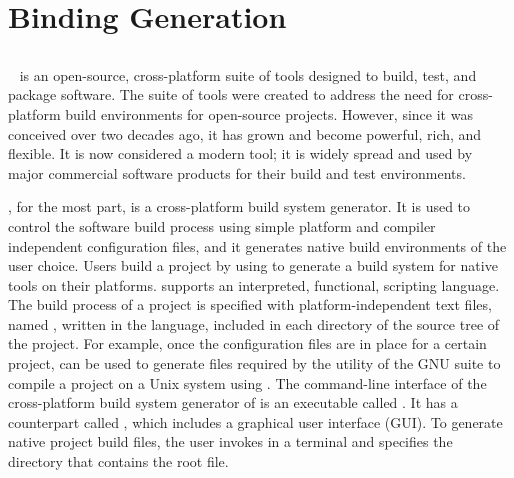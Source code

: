 \section{Binding Generation}
\label{sec:gen}

\subsection{\cmake}
\label{ssec:intro:cmake}
\cmake{}~\cite{mh-mc-08} is an open-source, cross-platform suite of tools designed to build, test, and package software. The suite of \cmake{} tools were created to address the need for cross-platform build environments for open-source projects. However, since it was conceived over two decades ago, it has grown and become powerful, rich, and flexible. It is now considered a modern tool; it is widely spread and used by major commercial software products for their build and test environments.

\cmake{}, for the most part, is a cross-platform build system generator.  It is used to control the software build process using simple platform and compiler independent configuration files, and it generates native build environments of the user choice. Users build a project by using \cmake{} to generate a build system for native tools on their platforms. \cmake{} supports an interpreted, functional, scripting language. The build process of a project is specified with platform-independent \cmake{} text files, named , written in the \cmake{} language, included in each directory of the source tree of the project. For example, once the \cmake{} configuration files are in place for a certain project, \cmake{} can be used to generate  files required by the  utility of the GNU suite to compile a project on a Unix system using . The command-line interface of the cross-platform build system generator of \cmake{} is an executable called . It has a counterpart called , which includes a graphical user interface (GUI). To generate native project build files, the user invokes  in a terminal and specifies the directory that contains the root  file.

